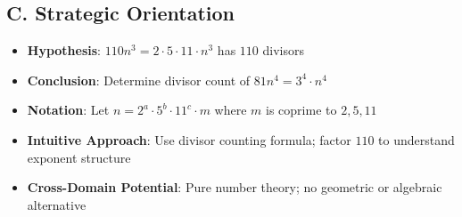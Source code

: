 \documentclass[]{article}
\begin{document}
\begin{problemconfigbox}
\subsection*{C. Strategic Orientation}
\begin{itemize}[leftmargin=*]
    \item \textbf{Hypothesis}: $110n^3 = 2 \cdot 5 \cdot 11 \cdot n^3$ has $110$ divisors
    \item \textbf{Conclusion}: Determine divisor count of $81n^4 = 3^4 \cdot n^4$
    \item \textbf{Notation}: Let $n = 2^a \cdot 5^b \cdot 11^c \cdot m$ where $m$ is coprime to $2, 5, 11$
    \item \textbf{Intuitive Approach}: Use divisor counting formula; factor $110$ to understand exponent structure
    \item \textbf{Cross-Domain Potential}: Pure number theory; no geometric or algebraic alternative
\end{itemize}
\end{problemconfigbox}
\end{document}
